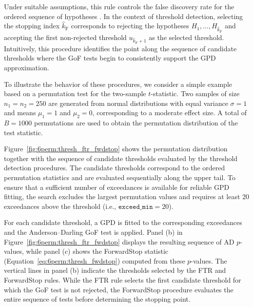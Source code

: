 Under suitable assumptions, this rule controls the false discovery rate for the ordered sequence of hypotheses \citep{gsell2016sequential}. In the context of threshold detection, selecting the stopping index $\hat{k}_{\mathrm{F}}$ corresponds to rejecting the hypotheses $H_1,\dots,H_{\hat{k}_{\mathrm{F}}}$ and accepting the first non-rejected threshold $u_{\hat{k}_{\mathrm{F}}+1}$ as the selected threshold. Intuitively, this procedure identifies the point along the sequence of candidate thresholds where the GoF tests begin to consistently support the GPD approximation.

To illustrate the behavior of these procedures, we consider a simple example based on a permutation test for the two-sample $t$-statistic. 
Two samples of size $n_1=n_2=250$ are generated from normal distributions with equal variance $\sigma=1$ and means $\mu_1=1$ and $\mu_2=0$, corresponding to a moderate effect size. A total of $B=1000$ permutations are used to obtain the permutation distribution of the test statistic.

Figure~\ref{fig:6perm:thresh_ftr_fwdstop} shows the permutation distribution together with the sequence of candidate thresholds evaluated by the threshold detection procedures. 
The candidate thresholds correspond to the ordered permutation statistics and are evaluated sequentially along the upper tail. 
To ensure that a sufficient number of exceedances is available for reliable GPD fitting, the search excludes the largest permutation values and requires at least 20 exceedances above the threshold (i.e., $\texttt{exceed\_min}=20$).

For each candidate threshold, a GPD is fitted to the corresponding exceedances and the Anderson--Darling GoF test is applied. Panel (b) in Figure~\ref{fig:6perm:thresh_ftr_fwdstop} displays the resulting sequence of AD $p$-values, while panel (c) shows the ForwardStop statistic (Equation~\eqref{eq:6perm:thresh_fwdstop}) computed from these $p$-values. The vertical lines in panel (b) indicate the thresholds selected by the FTR and ForwardStop rules. While the FTR rule selects the first candidate threshold for which the GoF test is not rejected, the ForwardStop procedure evaluates the entire sequence of tests before determining the stopping point.

